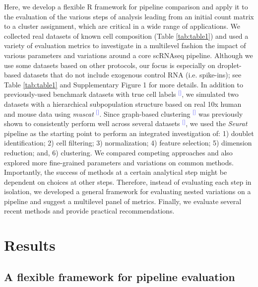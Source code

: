\documentclass[11pt]{article}
\renewcommand{\cite}[1]{\textcolor{Blue}{$^[$\supercite{#1}$^]$}}
\begin{document}
Here, we develop a flexible R framework for pipeline comparison and apply it to the evaluation of the various steps of analysis leading from an initial count matrix to a cluster assignment, which are critical in a wide range of applications. We collected real datasets of known cell composition (Table \ref{tab:table1}) and used a variety of evaluation metrics to investigate in a multilevel fashion the impact of various parameters and variations around a core scRNAseq pipeline. Although we use some datasets based on other protocols, our focus is especially on droplet-based datasets that do not include exogenous control RNA (i.e. spike-ins); see Table \ref{tab:table1} and Supplementary Figure 1 for more details. In addition to previously-used benchmark datasets with true cell labels \cite{duoClustering2018,tianMixology2018}, we simulated two datasets with a hierarchical subpopulation structure based on real 10x human and mouse data using \textit{muscat} \cite{CrowellMuscat2019}. 
Since graph-based clustering \cite{satijaSeurat2015} was previously shown to consistently perform well across several datasets \cite{duoClustering2018,tianMixology2018}, we used the \textit{Seurat} pipeline as the starting point to perform an integrated investigation of: 1) doublet identification; 2) cell filtering; 3) normalization; 4) feature selection; 5) dimension reduction; and, 6) clustering. We compared competing approaches and also explored more fine-grained parameters and variations on common methods. Importantly, the success of methods at a certain analytical step might be dependent on choices at other steps. Therefore, instead of evaluating each step in isolation, we developed a general framework for evaluating nested variations on a pipeline and suggest a multilevel panel of metrics. Finally, we evaluate several recent methods and provide practical recommendations.

\section*{Results}

\subsection*{A flexible framework for pipeline evaluation}
\end{document}
